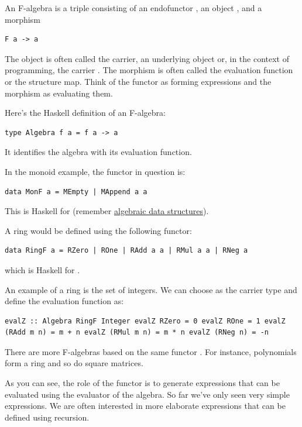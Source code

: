 An F-algebra is a triple consisting of an endofunctor , an
object , and a morphism

\begin{verbatim}
F a -> a
\end{verbatim}

The object is often called the carrier, an underlying object or, in the
context of programming, the carrier . The morphism is often
called the evaluation function or the structure map. Think of the
functor  as forming expressions and the morphism as evaluating
them.

Here's the Haskell definition of an F-algebra:

\begin{verbatim}
type Algebra f a = f a -> a
\end{verbatim}

It identifies the algebra with its evaluation function.

In the monoid example, the functor in question is:

\begin{verbatim}
data MonF a = MEmpty | MAppend a a
\end{verbatim}

This is Haskell for  (remember
\href{https://bartoszmilewski.com/2015/01/13/simple-algebraic-data-types/}{algebraic
data structures}).

A ring would be defined using the following functor:

\begin{verbatim}
data RingF a = RZero | ROne | RAdd a a | RMul a a | RNeg a
\end{verbatim}

which is Haskell for .

An example of a ring is the set of integers. We can choose
 as the carrier type and define the evaluation function
as:

\begin{verbatim}
evalZ :: Algebra RingF Integer evalZ RZero = 0 evalZ ROne = 1 evalZ (RAdd m n) = m + n evalZ (RMul m n) = m * n evalZ (RNeg n) = -n
\end{verbatim}

There are more F-algebras based on the same functor . For
instance, polynomials form a ring and so do square matrices.

As you can see, the role of the functor is to generate expressions that
can be evaluated using the evaluator of the algebra. So far we've only
seen very simple expressions. We are often interested in more elaborate
expressions that can be defined using recursion.

